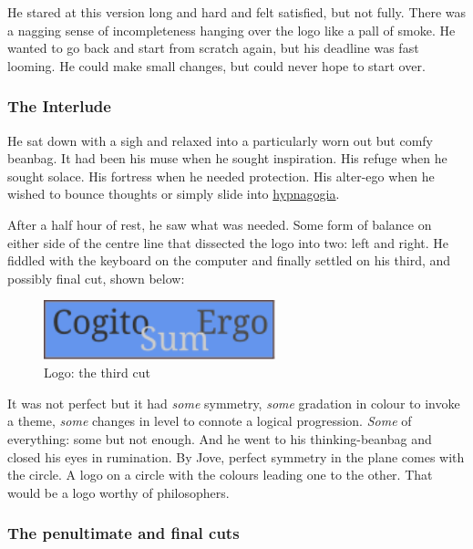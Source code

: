 \documentclass[
  11pt,
  british,
  a4paper,
]{article}
\makeatletter
\newcounter{figno}
\newenvironment{fignos:no-prefix-figure-caption}{
      \caption@ifcompatibility{}{
        \let\oldthefigure\thefigure
        \let\oldtheHfigure\theHfigure
        \renewcommand{\thefigure}{figno:\thefigno}
        \renewcommand{\theHfigure}{figno:\thefigno}
        \stepcounter{figno}
        \captionsetup{labelformat=empty}
      }
    }{
      \caption@ifcompatibility{}{
        \captionsetup{labelformat=default}
        \let\thefigure\oldthefigure
        \let\theHfigure\oldtheHfigure
        \addtocounter{figure}{-1}
      }
    }
\makeatother
\begin{document}
He stared at this version long and hard and felt satisfied, but not
fully. There was a nagging sense of incompleteness hanging over the logo
like a pall of smoke. He wanted to go back and start from scratch again,
but his deadline was fast looming. He could make small changes, but
could never hope to start over.

\hypertarget{the-interlude}{%
\subsubsection{The Interlude}\label{the-interlude}}

He sat down with a sigh and relaxed into a particularly worn out but
comfy beanbag. It had been his muse when he sought inspiration. His
refuge when he sought solace. His fortress when he needed protection.
His alter-ego when he wished to bounce thoughts or simply slide into
\href{https://en.wikipedia.org/wiki/Hypnagogia}{hypnagogia}.

After a half hour of rest, he saw what was needed. Some form of balance
on either side of the centre line that dissected the logo into two: left
and right. He fiddled with the keyboard on the computer and finally
settled on his third, and possibly final cut, shown below:

\begin{fignos:no-prefix-figure-caption}

\begin{figure}
\centering
\includegraphics[width=0.6\textwidth,height=\textheight]{images/thirdcut.svg}
\caption{Logo: the third cut}
\end{figure}

\end{fignos:no-prefix-figure-caption}

It was not perfect but it had \emph{some} symmetry, \emph{some}
gradation in colour to invoke a theme, \emph{some} changes in level to
connote a logical progression. \emph{Some} of everything: some but not
enough. And he went to his thinking-beanbag and closed his eyes in
rumination. By Jove, perfect symmetry in the plane comes with the
circle. A logo on a circle with the colours leading one to the other.
That would be a logo worthy of philosophers.

\hypertarget{the-penultimate-and-final-cuts}{%
\subsubsection{The penultimate and final
cuts}\label{the-penultimate-and-final-cuts}}
\end{document}
